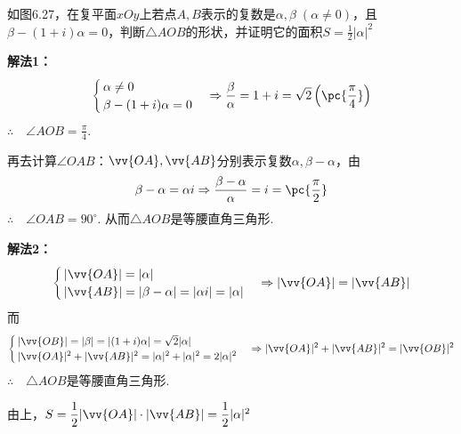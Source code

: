 \begin{example}
    如图6.27，在复平面$xOy$上若点$A,B$表示的复数是$\alpha,\beta\; (\alpha\ne 0)$，且$\beta-(1+i)\alpha=0$，判断$\triangle AOB$的形状，并证明它的面积$S=\frac{1}{2}|\alpha|^2$
\end{example}

\begin{figure}[htp]
    \centering
{}
    \caption{}
\end{figure}

\begin{solution}
\textbf{解法1：}
\[\begin{cases}
\alpha\ne 0\\
\beta-(1+i)\alpha=0
\end{cases}\Rightarrow \frac{\beta}{\alpha}=1+i=\sqrt{2}\left(\pc{\frac{\pi}{4}}\right)\]
$\therefore\quad \angle AOB=\frac{\pi}{4}$.

再去计算$\angle OAB$：$\vv{OA},\vv{AB}$分别表示复数$\alpha,\beta-\alpha$，由
\[\beta-\alpha=\alpha i\Rightarrow \frac{\beta-\alpha}{\alpha}=i=\pc{\frac{\pi}{2}}\]
$\therefore\quad \angle OAB=90^{\circ}$. 从而$\triangle AOB$是等腰直角三角形.

\textbf{解法2：}
\[\begin{cases}
    |\vv{OA}|=|\alpha|\\
    |\vv{AB}|=|\beta-\alpha|=|\alpha i|=|\alpha|
\end{cases}\Rightarrow  |\vv{OA}|=|\vv{AB}|\]
而
\[\begin{cases}
    |\vv{OB}|=|\beta|=|(1+i)\alpha|=\sqrt{2}|\alpha|\\
    |\vv{OA}|^2+|\vv{AB}|^2=|\alpha|^2+|\alpha|^2=2|\alpha|^2
\end{cases}\Rightarrow |\vv{OA}|^2+|\vv{AB}|^2=|\vv{OB}|^2\]
$\therefore\quad \triangle AOB$是等腰直角三角形.

由上，$S=\frac{1}{2}|\vv{OA}|\cdot |\vv{AB}|=\frac{1}{2}|\alpha|^2$
\end{solution}


